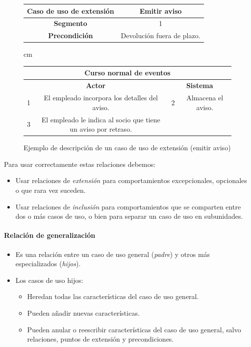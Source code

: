 \documentclass[12pt,spanish]{article}
\begin{document}
\begin{figure}[H]
\centering
\begin{tabular}{|c|c|c|c|}
\hline
\multicolumn{2}{|c|}{\textbf{Caso de uso de extensión}} & \multicolumn{2}{c|}{Emitir aviso} \\
\hline
\multicolumn{2}{|c|}{\textbf{Segmento}} & \multicolumn{2}{c|}{1}\\
\hline
\multicolumn{2}{|c|}{\textbf{Precondición}} & \multicolumn{2}{c|}{Devolución fuera de plazo.}\\
\hline
\end{tabular}
 cm
\begin{tabular}{|c|c|c|c|}
\hline
\multicolumn{4}{|c|}{\textbf{Curso normal de eventos}} \\
\hline
\multicolumn{2}{|c|}{\textbf{Actor}} & \multicolumn{2}{c|}{\textbf{Sistema}}\\
\hline
1 & El empleado incorpora los detalles del aviso. & 2 & Almacena el aviso.\\
\hline
3 & El empleado le indica al socio que tiene un aviso por retraso. & & \\
\hline
\end{tabular}
\caption{Ejemplo de descripción de un caso de uso de extensión (emitir aviso)}
\end{figure}


Para usar correctamente estas relaciones debemos:
\begin{itemize}
	\item Usar relaciones de \emph{extensión} para comportamientos excepcionales, opcionales o que rara vez suceden.
	\item Usar relaciones de \emph{inclusión} para comportamientos que se comparten entre dos o más casos de uso, o bien para separar un caso de uso en subunidades.
\end{itemize}

\paragraph{Relación de generalización}

\begin{itemize}
	\item Es una relación entre un caso de uso general (\emph{padre}) y otros más especializados (\emph{hijos}).
	\item Los casos de uso hijos:
		\begin{itemize}
			\item Heredan todas las características del caso de uso general.
			\item Pueden añadir nuevas características.
			\item Pueden anular o reescribir características del caso de uso general, salvo relaciones, puntos de extensión y precondiciones.
		\end{itemize}
\end{itemize}
\end{document}
